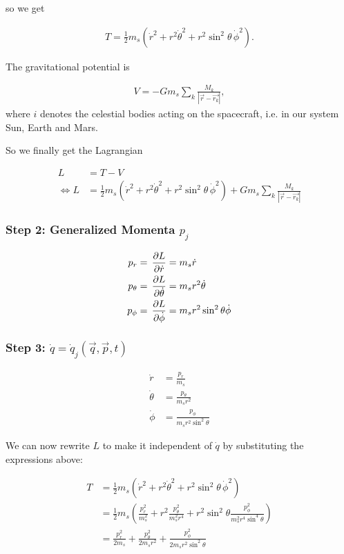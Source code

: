 so we get

\begin{align}
    T = \frac{1}{2} m_s (\dot{r}^2 + r^2\dot{\theta}^2 + r^2\sin^2{\theta}\,\dot{\phi}^2).
\end{align}

The gravitational potential is \cite{WikiGravPotential}

\begin{align}
    V = -G m_s \sum\limits_{k} \frac{M_k}{\left| \vec{r} - \vec{r_k} \right|},
\end{align}
where \(i\) denotes the celestial bodies acting on the spacecraft, i.e. in our system Sun, Earth and Mars.

So we finally get the Lagrangian

\begin{align}
    L &= T - V \\
    \Leftrightarrow L &= \frac{1}{2} m_s (\dot{r}^2 + r^2\dot{\theta}^2 + r^2\sin^2{\theta}\,\dot{\phi}^2) + G m_s \sum\limits_{k} \frac{M_k}{\left| \vec{r} - \vec{r_k} \right|}
\end{align}

\subsubsection{Step 2: Generalized Momenta \(p_j\)}
\begin{align}
    p_r &= \operatorname{}\frac{\partial L}{\partial \dot{r}} = m_s \dot{r} \label{eq:pr} \\
    p_\theta &= \operatorname{}\frac{\partial L}{\partial \dot{\theta}} = m_s r^2 \dot{\theta} \label{eq:ptheta} \\
    p_\phi &= \operatorname{}\frac{\partial L}{\partial \dot{\phi}} = m_s r^2 \sin^2{\theta} \dot{\phi} \label{eq:pphi}
\end{align}

\subsubsection{Step 3: \(\dot{q} = \dot{q}_j(\vec{q}, \vec{p}, t)\)}
\begin{align}
    \dot{r} &= \frac{p_r}{m_s} \\
    \dot{\theta} &= \frac{p_\theta}{m_s r^2} \\
    \dot{\phi} &= \frac{p_\phi}{m_s r^2 \sin^2{\theta}}
\end{align}

We can now rewrite \(L\) to make it independent of \(\dot{q}\) by substituting the expressions above:

\begin{align}
    T &= \frac{1}{2} m_s (\dot{r}^2 + r^2\dot{\theta}^2 + r^2\sin^2{\theta}\,\dot{\phi}^2) \\
    &= \frac{1}{2} m_s \left(\frac{p_r^2}{m_s^2} + r^2\frac{p_\theta^2}{m_s^2 r^4} + r^2\sin^2{\theta}\frac{p_\phi^2}{m_s^2 r^4 \sin^4{\theta}} \right) \\
    &= \frac{p_r^2}{2 m_s} + \frac{p_\theta^2}{2 m_s r^2} + \frac{p_\phi^2}{2 m_s r^2 \sin^2{\theta}} \\
\end{align}


